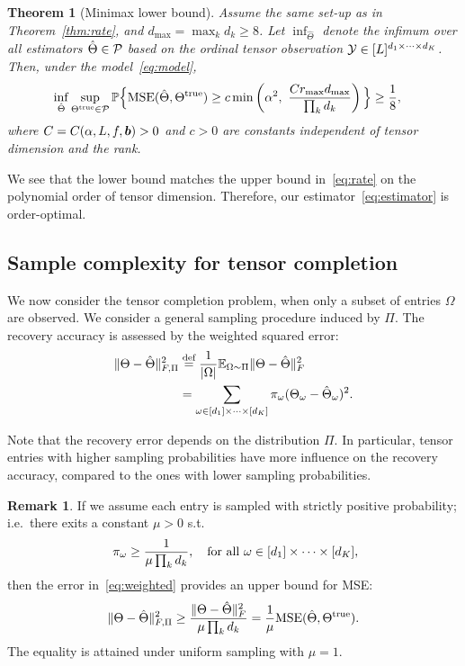 \documentclass[11pt]{article}
\theoremstyle{plain}
\newtheorem{thm}{Theorem}[section]
\theoremstyle{definition}
\newtheorem{rmk}{Remark}
\providecommand{\DIFaddbegin}{} %
\providecommand{\DIFaddend}{} %
\begin{document}
\begin{thm}[Minimax lower bound]\label{thm:minimax}
Assume the same set-up as in Theorem~\ref{thm:rate}, and $d_{\max}=\max_k d_k \geq 8$. Let $\inf_{\hat \Theta}$ denote the infimum over all estimators $\hat \Theta\in\mathcal{P}$ based on the ordinal tensor observation $\mathcal{Y}\in[L]^{d_1\times \cdots \times d_K}$. Then, under the model~\eqref{eq:model},
\begin{align}\label{eq:lower}
\inf_{\hat \Theta }\sup_{\Theta^{\text{true}}\in\mathcal{P}} \mathbb{P}\Big\{& \text{MSE}(\hat \Theta, \Theta^{\text{true}})  \geq c \min\left( \alpha^2, \ { Cr_{\max}d_{\max} \over \prod_k d_k} \right) \Big\} \geq {1\over 8},
\end{align}
where $C=C(\alpha, L, f,\bm{b})>0$ and $c>0$ are constants independent of tensor dimension and the rank.\DIFaddbegin \\
\DIFaddend \end{thm}
\DIFaddbegin 

\DIFaddend We see that the lower bound matches the upper bound in~\eqref{eq:rate} on the polynomial order of tensor dimension. Therefore, our estimator~\eqref{eq:estimator} is order-optimal.

\subsection{Sample complexity for tensor completion}
We now consider the tensor completion problem, when only a subset of entries $\Omega$ are observed. We consider a general sampling procedure induced by $\Pi$. The recovery accuracy is assessed by the weighted squared error:
\begin{align}\label{eq:weighted}
\lVert\Theta-\hat \Theta\rVert_{F,\Pi}^2&\stackrel{\text{def}}{=}
{1\over |\Omega|}\mathbb{E}_{\Omega\sim \Pi}\lVert\Theta-\hat \Theta\rVert_F^2\notag \\
&=\sum_{\omega\in[d_1]\times \cdots \times [d_K]} \pi_{\omega}(\Theta_{\omega}-\hat \Theta_{\omega})^2.
\end{align}

Note that the recovery error depends on the distribution $\Pi$. In particular, tensor entries with higher sampling probabilities have more influence on the recovery accuracy, compared to the ones with lower sampling probabilities.

\begin{rmk} If we assume each entry is sampled with strictly positive probability; i.e.\ there exits a constant $\mu> 0$ s.t.
\[
\ \pi_\omega\geq {1\over \mu \prod_k d_k},\quad \text{for all}\ \omega\in[d_1]\times\cdots \times [d_K],
\]
then the error in~\eqref{eq:weighted} provides an upper bound for MSE:
\[
\lVert\Theta-\hat \Theta\rVert_{F,\Pi}^2 \geq {\lVert\Theta-\hat \Theta\rVert_F^2\over \mu \prod_kd_k}={1\over \mu}\text{MSE}(\hat \Theta, \Theta^{\text{true}}).
\]
The equality is attained under uniform sampling with $\mu=1$.
\end{rmk}
\end{document}
